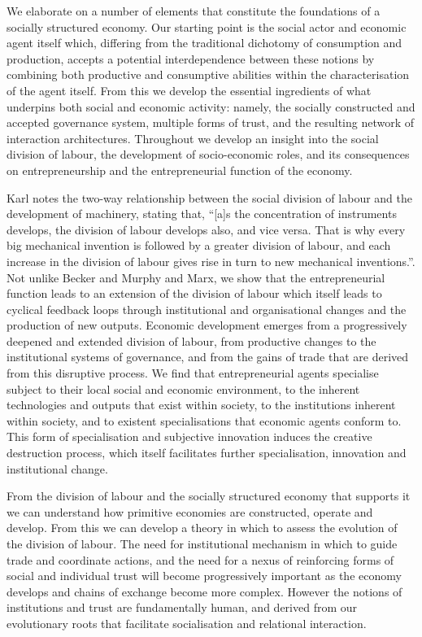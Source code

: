We elaborate on a number of elements that constitute the foundations of a socially structured economy. Our starting point is the social actor and economic agent itself which, differing from the traditional dichotomy of consumption and production, accepts a potential interdependence between these notions by combining both productive and consumptive abilities within the characterisation of the agent itself. From this we develop the essential ingredients of what underpins both social and economic activity: namely, the socially constructed and accepted governance system, multiple forms of trust, and the resulting network of interaction architectures. Throughout we develop an insight into the social division of labour, the development of socio-economic roles, and its consequences on entrepreneurship and the entrepreneurial function of the economy.

Karl \citet[p.~139]{Marx1847} notes the two-way relationship between the social division of labour and the development of machinery, stating that, ``[a]s the concentration of instruments develops, the division of labour develops also, and vice versa. That is why every big mechanical invention is followed by a greater division of labour, and each increase in the division of labour gives rise in turn to new mechanical inventions.''. Not unlike Becker and Murphy and Marx, we show that the entrepreneurial function leads to an extension of the division of labour which itself leads to cyclical feedback loops through institutional and organisational changes and the production of new outputs. Economic development emerges from a progressively deepened and extended division of labour, from productive changes to the institutional systems of governance, and from the gains of trade that are derived from this disruptive process. We find that entrepreneurial agents specialise subject to their local social and economic environment, to the inherent technologies and outputs that exist within society, to the institutions inherent within society, and to existent specialisations that economic agents conform to. This form of specialisation and subjective innovation induces the creative destruction process, which itself facilitates further specialisation, innovation and institutional change.

From the division of labour and the socially structured economy that supports it we can understand how primitive economies are constructed, operate and develop. From this we can develop a theory in which to assess the evolution of the division of labour. The need for institutional mechanism in which to guide trade and coordinate actions, and the need for a nexus of reinforcing forms of social and individual trust will become progressively important as the economy develops and chains of exchange become more complex. However the notions of institutions and trust are fundamentally human, and derived from our evolutionary roots that facilitate socialisation and relational interaction.

